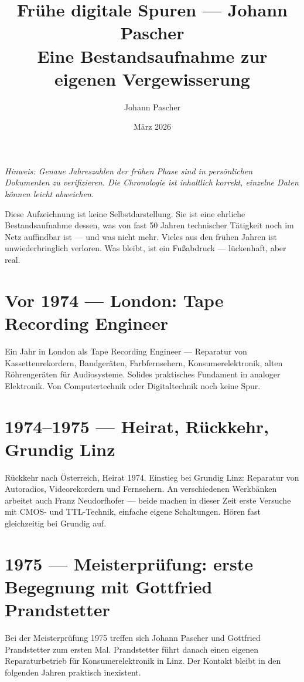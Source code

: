 \documentclass[11pt]{report}
\title{\textbf{Frühe digitale Spuren --- Johann Pascher}\\
\large Eine Bestandsaufnahme zur eigenen Vergewisserung}
\author{Johann Pascher}
\date{März 2026}
\begin{document}
\maketitle

\textit{Hinweis: Genaue Jahreszahlen der frühen Phase sind in persönlichen Dokumenten zu verifizieren. Die Chronologie ist inhaltlich korrekt, einzelne Daten können leicht abweichen.}

\bigskip

Diese Aufzeichnung ist keine Selbstdarstellung. Sie ist eine ehrliche Bestandsaufnahme dessen, was von fast 50 Jahren technischer Tätigkeit noch im Netz auffindbar ist --- und was nicht mehr. Vieles aus den frühen Jahren ist unwiederbringlich verloren. Was bleibt, ist ein Fußabdruck --- lückenhaft, aber real.

\section{Vor 1974 --- London: Tape Recording Engineer}

Ein Jahr in London als Tape Recording Engineer --- Reparatur von Kassettenrekordern, Bandgeräten, Farbfernsehern, Konsumerelektronik, alten Röhrengeräten für Audiosysteme. Solides praktisches Fundament in analoger Elektronik. Von Computertechnik oder Digitaltechnik noch keine Spur.

\section{1974--1975 --- Heirat, Rückkehr, Grundig Linz}

Rückkehr nach Österreich, Heirat 1974. Einstieg bei Grundig Linz: Reparatur von Autoradios, Videorekordern und Fernsehern. An verschiedenen Werkbänken arbeitet auch Franz Neudorfhofer --- beide machen in dieser Zeit erste Versuche mit CMOS- und TTL-Technik, einfache eigene Schaltungen. Hören fast gleichzeitig bei Grundig auf.

\section{1975 --- Meisterprüfung: erste Begegnung mit Gottfried Prandstetter}

Bei der Meisterprüfung 1975 treffen sich Johann Pascher und Gottfried Prandstetter zum ersten Mal. Prandstetter führt danach einen eigenen Reparaturbetrieb für Konsumerelektronik in Linz. Der Kontakt bleibt in den folgenden Jahren praktisch inexistent.
\end{document}
